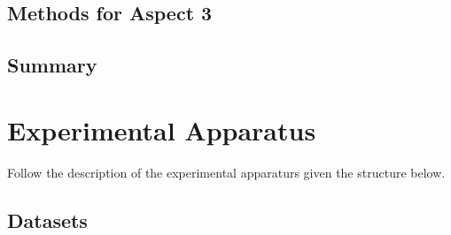 \documentclass[sigconf, review, nonacm]{acmart}
\begin{document}
\subsection{Methods for Aspect 3}




\subsection{Summary}

\section{Experimental Apparatus}
\label{sec:experimentalapparatus}

Follow the description of the experimental apparaturs given the structure below.



\subsection{Datasets}
\label{sec:datasets}
\end{document}
